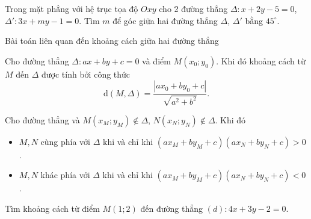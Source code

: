 \begin{vd}
	Trong mặt phẳng với hệ trục tọa độ $Oxy$ cho 2 đường thẳng $\Delta:x + 2y - 5=0$, $\Delta':3x + my - 1=0$. Tìm $m$ để góc giữa hai đường thẳng $\Delta$, $\Delta'$ bằng ${45}^{\circ}$.
\end{vd}
\begin{dang}{Bài toán liên quan đến khoảng cách giữa hai đường thẳng}
	\begin{dl}
		Cho đường thẳng $ \Delta \colon ax+by+c=0$ và điểm $M(x_0;y_0)$. Khi đó khoảng cách từ $M$ đến $ \Delta $ được tính bởi công thức 
		\begin{equation*}
			\mathrm{d}\left(M, \Delta \right)=\dfrac{|ax_0+by_0+c|}{\sqrt{a^2+b^2}}.
		\end{equation*}
	\end{dl}
	\begin{hq}
		Cho đường thẳng và $M(x_M;y_M)\notin \Delta $, $N(x_N;y_N)\notin \Delta $. Khi đó
		\begin{itemize}
			\item $M, N$ cùng phía với $ \Delta $ khi và chỉ khi $(ax_M+by_M+c)(ax_N+by_N+c)>0$.
			\item $M, N$ khác phía với $ \Delta $ khi và chỉ khi $(ax_M+by_M+c)(ax_N+by_N+c)<0$.
		\end{itemize}
	\end{hq}
\end{dang}
\begin{vd}
	Tìm khoảng cách từ điểm $M(1;2)$ đến đường thẳng $(d)\colon 4x+3y-2=0$.
\end{vd}

